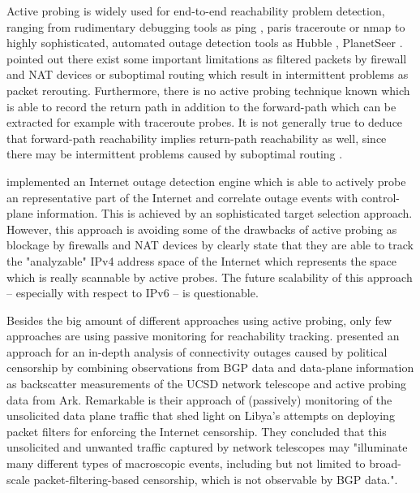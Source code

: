 Active probing is widely used for end-to-end reachability problem detection, ranging from rudimentary debugging tools as ping \citep{PING}, paris traceroute \citep{traceroute} or nmap \citep{Nmap} to highly sophisticated, automated outage detection tools as Hubble \citep{Katz:2008}, PlanetSeer \citep{Zhang:2004}. \citet{Bush:Optometry} pointed out there exist some important limitations as filtered packets by firewall and NAT devices or suboptimal routing which result in intermittent problems as packet rerouting. Furthermore, there is no active probing technique known which is able to record the return path in addition to the forward-path which can be extracted for example with traceroute probes. It is not generally true to deduce that forward-path reachability implies return-path reachability as well, since there may be intermittent problems caused by suboptimal routing \citep{Bush:Optometry}.

\citet{Quan12a} implemented an Internet outage detection engine which is able to actively probe an representative part of the Internet and correlate outage events with control-plane information. This is achieved by an sophisticated target selection approach. However, this approach is avoiding some of the drawbacks of active probing as blockage by firewalls and NAT devices by clearly state that they are able to track the "analyzable" IPv4 address space of the Internet which represents the space which is really scannable by active probes. The future scalability of this approach -- especially with respect to IPv6 -- is questionable. 
 
Besides the big amount of different approaches using active probing, only few approaches are using passive monitoring for reachability tracking. \citet{Dainotti:2011:ACI} presented an approach for an in-depth analysis of connectivity outages caused by political censorship by combining observations from BGP data and data-plane information as backscatter measurements of the UCSD network telescope and active probing data from Ark. Remarkable is their approach of (passively) monitoring of the unsolicited data plane traffic that shed light on Libya's attempts on deploying packet filters for enforcing the Internet censorship. They concluded that this unsolicited and unwanted traffic captured by network telescopes may "illuminate many different types of macroscopic events, including but not limited to broad-scale packet-filtering-based censorship, which is not observable by BGP data."\citep{Dainotti:2011:ACI}.

